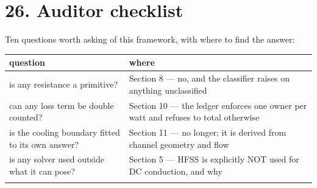 \documentclass[10pt,]{article}
\begin{document}
\hypertarget{auditor-checklist}{%
\section{26. Auditor checklist}\label{auditor-checklist}}

Ten questions worth asking of this framework, with where to find the
answer:

\begin{longtable}[]{@{}ll@{}}
\toprule
\begin{minipage}[b]{0.47\columnwidth}\raggedright
question\strut
\end{minipage} & \begin{minipage}[b]{0.47\columnwidth}\raggedright
where\strut
\end{minipage}\tabularnewline
\midrule
\endhead
\begin{minipage}[t]{0.47\columnwidth}\raggedright
is any resistance a primitive?\strut
\end{minipage} & \begin{minipage}[t]{0.47\columnwidth}\raggedright
Section 8 --- no, and the classifier raises on anything
unclassified\strut
\end{minipage}\tabularnewline
\begin{minipage}[t]{0.47\columnwidth}\raggedright
can any loss term be double counted?\strut
\end{minipage} & \begin{minipage}[t]{0.47\columnwidth}\raggedright
Section 10 --- the ledger enforces one owner per watt and refuses to
total otherwise\strut
\end{minipage}\tabularnewline
\begin{minipage}[t]{0.47\columnwidth}\raggedright
is the cooling boundary fitted to its own answer?\strut
\end{minipage} & \begin{minipage}[t]{0.47\columnwidth}\raggedright
Section 11 --- no longer; it is derived from channel geometry and
flow\strut
\end{minipage}\tabularnewline
\begin{minipage}[t]{0.47\columnwidth}\raggedright
is any solver used outside what it can pose?\strut
\end{minipage} & \begin{minipage}[t]{0.47\columnwidth}\raggedright
Section 5 --- HFSS is explicitly NOT used for DC conduction, and
why\strut
\end{minipage}\tabularnewline
\begin{minipage}[t]{0.47\columnwidth}\raggedright

\end{minipage}
\end{longtable}
\end{document}
